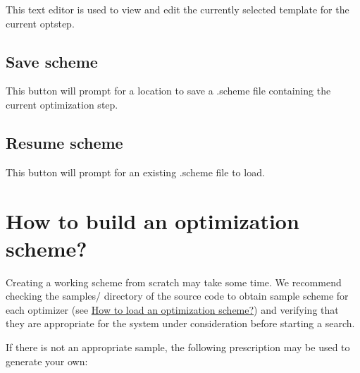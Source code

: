 This text editor is used to view and edit the currently selected template for the current optstep.\hypertarget{optschemes_gui-save}{}\subsection{Save scheme}\label{optschemes_gui-save}
This button will prompt for a location to save a .scheme file containing the current optimization step.\hypertarget{optschemes_gui-load}{}\subsection{Resume scheme}\label{optschemes_gui-load}
This button will prompt for an existing .scheme file to load.\hypertarget{optschemes_creating}{}\section{How to build an optimization scheme?}\label{optschemes_creating}
Creating a working scheme from scratch may take some time. We recommend checking the samples/ directory of the source code to obtain sample scheme for each optimizer (see \hyperlink{optschemes_loading}{How to load an optimization scheme?}) and verifying that they are appropriate for the system under consideration before starting a search.

If there is not an appropriate sample, the following prescription may be used to generate your own\+:



